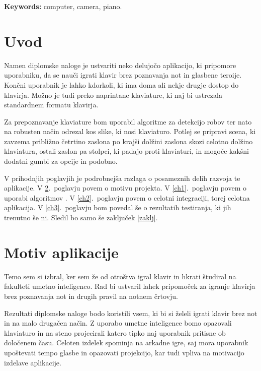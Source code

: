 \documentclass[a4paper,12pt,openright]{book}
\newcommand{\tkeywordsEn}{computer, camera, piano}
\newcommand{\clearemptydoublepage}{\newpage{\pagestyle{empty}\cleardoublepage}}
\begin{document}
\noindent\textbf{Keywords:} \tkeywordsEn.
\clearemptydoublepage

\mainmatter
\setcounter{page}{1}
\pagestyle{fancy}

\chapter{Uvod}

Namen diplomske naloge je ustvariti neko delujočo aplikacijo, ki pripomore uporabniku, da se nauči igrati klavir brez poznavanja not in glasbene teroije. Končni uporabnik je lahko kdorkoli, ki ima doma ali nekje drugje dostop do klavirja. Možno je tudi preko naprintane klaviature, ki naj bi ustrezala standardnem formatu klavirja.

Za prepoznavanje klaviature bom uporabil algoritme za detekcijo robov ter nato na robusten način odrezal kos slike, ki nosi klaviaturo. Potlej se pripravi scena, ki zavzema približno četrtino zaslona po krajši dolžini zaslona skozi celotno dolžino klaviatura, ostali zaslon pa stolpci, ki padajo proti klaviaturi, in mogoče kakšni dodatni gumbi za opcije in podobno.

V prihodnjih poglavjih je podrobnejša razlaga o posameznih delih razvoja te aplikacije.
V \ref{ch0}.~poglavju povem o motivu projekta.
V \ref{ch1}.~poglavju povem o uporabi algoritmov .
V \ref{ch2}.~poglavju povem o celotni integraciji, torej celotna aplikacija.
V \ref{ch3}.~poglavju bom povedal še o rezultatih testiranja, ki jih trenutno še ni.
Sledil bo samo še zaključek \ref{zaklj}.


\chapter{Motiv aplikacije}
\label{ch0}

Temo sem si izbral, ker sem že od otroštva igral klavir in hkrati študiral na fakulteti umetno inteligenco. Rad bi ustvaril lahek pripomoček za igranje klavirja brez poznavanja not in drugih pravil na notnem črtovju.

Rezultati diplomske naloge bodo koristili vsem, ki bi si želeli igrati klavir brez not in na malo drugačen način. Z uporabo umetne inteligence bomo opazovali klaviaturo in na steno projecirali katero tipko naj uporabnik pritisne ob določenem času. Celoten izdelek spominja na arkadne igre, saj mora uporabnik upoštevati tempo glasbe in opazovati projekcijo, kar tudi vpliva na motivacijo izdelave aplikacije.
\end{document}
